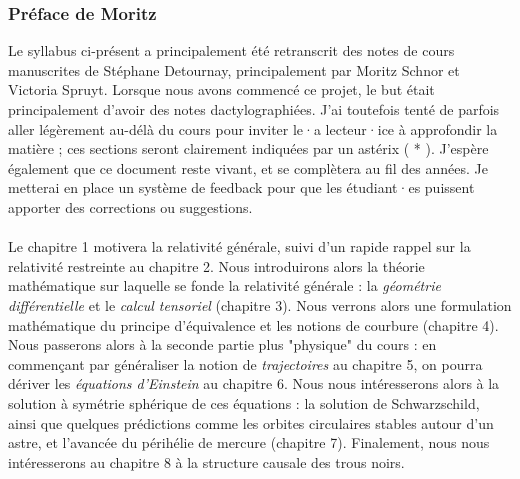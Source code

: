 \subsubsection{Préface de Moritz}
Le syllabus ci-présent a principalement été retranscrit des notes de cours manuscrites de Stéphane Detournay, principalement par Moritz Schnor et Victoria Spruyt. Lorsque nous avons commencé ce projet, le but était principalement d'avoir des notes dactylographiées. J'ai toutefois tenté de parfois aller légèrement au-délà du cours pour inviter le·a lecteur·ice à approfondir la matière ; ces sections seront clairement indiquées par un astérix ( * ). J'espère également que ce document reste vivant, et se complètera au fil des années. Je metterai en place un système de feedback pour que les étudiant·es puissent apporter des corrections ou suggestions. \\
\\
Le chapitre 1 motivera la relativité générale, suivi d'un rapide rappel sur la relativité restreinte au chapitre 2. Nous introduirons alors la théorie mathématique sur laquelle se fonde la relativité générale : la \emph{géométrie différentielle} et le \emph{calcul tensoriel} (chapitre 3). Nous verrons alors une formulation mathématique du principe d'équivalence et les notions de courbure (chapitre 4). Nous passerons alors à la seconde partie plus "physique" du cours : en commençant par généraliser la notion de \emph{trajectoires} au chapitre 5, on pourra dériver les \emph{équations d'Einstein} au chapitre 6. Nous nous intéresserons alors à la solution à symétrie sphérique de ces équations : la solution de Schwarzschild, ainsi que quelques prédictions comme les orbites circulaires stables autour d'un astre, et l'avancée du périhélie de mercure (chapitre 7). Finalement, nous nous intéresserons au chapitre 8 à la structure causale des trous noirs.
\cutebreak